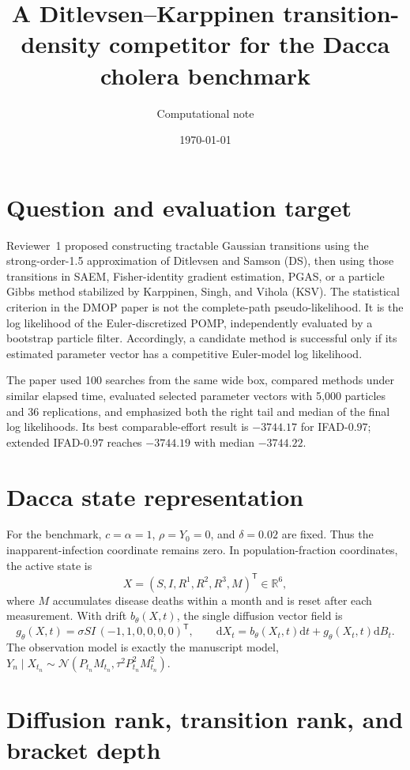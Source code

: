 \documentclass[11pt]{article}
\title{A Ditlevsen--Karppinen transition-density competitor for the
Dacca cholera benchmark}
\author{Computational note}
\date{\today}
\newcommand{\N}{\mathcal N}
\newcommand{\dd}{\mathrm d}
\begin{document}
\maketitle

\section{Question and evaluation target}

Reviewer~1 proposed constructing tractable Gaussian transitions using the
strong-order-1.5 approximation of Ditlevsen and Samson (DS), then using those
transitions in SAEM, Fisher-identity gradient estimation, PGAS, or a particle
Gibbs method stabilized by Karppinen, Singh, and Vihola (KSV).  The statistical
criterion in the DMOP paper is not the complete-path pseudo-likelihood.  It is
the log likelihood of the Euler-discretized POMP, independently evaluated by a
bootstrap particle filter.  Accordingly, a candidate method is successful only
if its estimated parameter vector has a competitive Euler-model log likelihood.

The paper used 100 searches from the same wide box, compared methods under
similar elapsed time, evaluated selected parameter vectors with 5,000 particles
and 36 replications, and emphasized both the right tail and median of the final
log likelihoods.  Its best comparable-effort result is $-3744.17$ for
IFAD-$0.97$; extended IFAD-$0.97$ reaches $-3744.19$ with median $-3744.22$.

\section{Dacca state representation}

For the benchmark, $c=\alpha=1$, $\rho=Y_0=0$, and $\delta=0.02$ are fixed.
Thus the inapparent-infection coordinate remains zero.  In population-fraction
coordinates, the active state is
\[
 X=(S,I,R^1,R^2,R^3,M)^\mathsf T\in\mathbb R^6,
\]
where $M$ accumulates disease deaths within a month and is reset after each
measurement.  With drift $b_\theta(X,t)$, the single diffusion vector field is
\[
 g_\theta(X,t)=\sigma S I\,(-1,1,0,0,0,0)^\mathsf T,
 \qquad \dd X_t=b_\theta(X_t,t)\dd t+g_\theta(X_t,t)\dd B_t.
\]
The observation model is exactly the manuscript model,
$Y_n\mid X_{t_n}\sim\N(P_{t_n}M_{t_n},
\tau^2P_{t_n}^2M_{t_n}^2)$.

\section{Diffusion rank, transition rank, and bracket depth}
\end{document}
